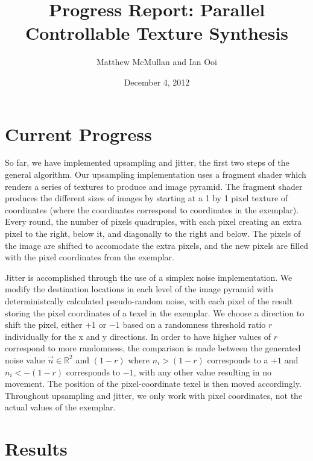 \documentclass[12pt]{article}
\title{Progress Report: Parallel Controllable Texture Synthesis}
\author{Matthew McMullan and Ian Ooi}
\date{December 4, 2012}
\begin{document}
    \maketitle
    \section{Current Progress}
        So far, we have implemented upsampling and jitter, the first two steps of the general algorithm.  Our upsampling implementation uses a fragment shader which renders a series of textures to produce and image pyramid.  The fragment shader produces the different sizes of images by starting at a 1 by 1 pixel texture of coordinates (where the coordinates correspond to coordinates in the exemplar).  Every round, the number of pixels quadruples, with each pixel creating an extra pixel to the right, below it, and diagonally to the right and below.  The pixels of the image are shifted to accomodate the extra pixels, and the new pixels are filled with the pixel coordinates from the exemplar.
        
      Jitter is accomplished through the use of a simplex noise implementation. We modify the destination locations in each level of the image pyramid with deterministcally calculated pseudo-random noise, with each pixel of the result storing the pixel coordinates of a texel in the exemplar.  We choose a direction to shift the pixel, either $+1$ or $-1$ based on a randomness threshold ratio $r$ individually for the x and y directions.  In order to have higher values of $r$ correspond to more randomness, the comparison is made between the generated noise value $\vec{n} \in \mathbb{R}^2$ and $\left(1 - r \right)$ where $n_i > (1-r)$ corresponds to a $+1$ and $n_i < -(1-r)$ corresponds to $-1$, with any other value resulting in no movement.  The position of the pixel-coordinate texel is then moved accordingly.  Throughout upsampling and jitter, we only work with pixel coordinates, not the actual values of the exemplar.

    \section{Results}
\end{document}
